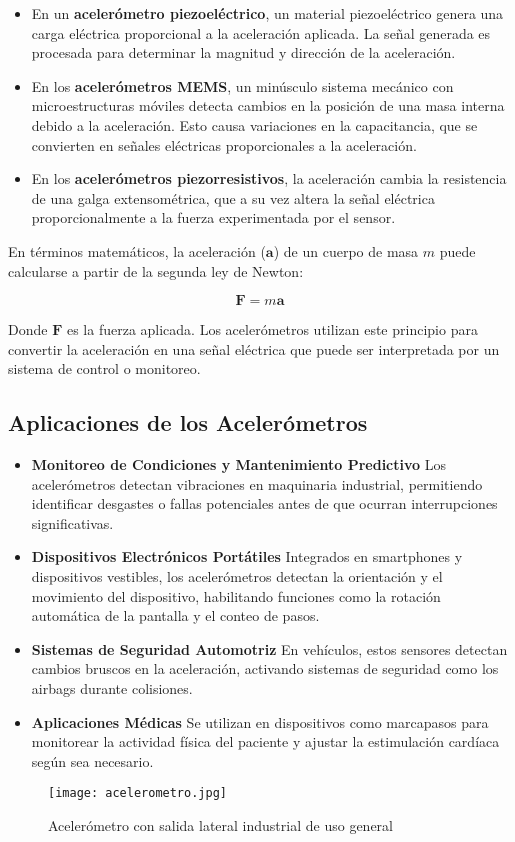 \begin{itemize}
	\item En un \textbf{acelerómetro piezoeléctrico}, un material piezoeléctrico genera una carga eléctrica proporcional a la aceleración aplicada. La señal generada es procesada para determinar la magnitud y dirección de la aceleración.
	
	\item En los \textbf{acelerómetros MEMS}, un minúsculo sistema mecánico con microestructuras móviles detecta cambios en la posición de una masa interna debido a la aceleración. Esto causa variaciones en la capacitancia, que se convierten en señales eléctricas proporcionales a la aceleración.
	
	\item En los \textbf{acelerómetros piezorresistivos}, la aceleración cambia la resistencia de una galga extensométrica, que a su vez altera la señal eléctrica proporcionalmente a la fuerza experimentada por el sensor.
\end{itemize}

En términos matemáticos, la aceleración (\(\mathbf{a}\)) de un cuerpo de masa \(m\) puede calcularse a partir de la segunda ley de Newton:

\[
\mathbf{F} = m \mathbf{a}
\]

Donde \(\mathbf{F}\) es la fuerza aplicada. Los acelerómetros utilizan este principio para convertir la aceleración en una señal eléctrica que puede ser interpretada por un sistema de control o monitoreo.

\subsection{\textbf{Aplicaciones de los Acelerómetros}}
\begin{itemize}
	\item \textbf{Monitoreo de Condiciones y Mantenimiento Predictivo}
	Los acelerómetros detectan vibraciones en maquinaria industrial, permitiendo identificar desgastes o fallas potenciales antes de que ocurran interrupciones significativas.
	
	\item \textbf{Dispositivos Electrónicos Portátiles}
	Integrados en smartphones y dispositivos vestibles, los acelerómetros detectan la orientación y el movimiento del dispositivo, habilitando funciones como la rotación automática de la pantalla y el conteo de pasos.
	
	\item \textbf{Sistemas de Seguridad Automotriz}
	En vehículos, estos sensores detectan cambios bruscos en la aceleración, activando sistemas de seguridad como los airbags durante colisiones.
	
	\item \textbf{Aplicaciones Médicas}
	Se utilizan en dispositivos como marcapasos para monitorear la actividad física del paciente y ajustar la estimulación cardíaca según sea necesario.
\end{itemize}
\begin{figure}[H]
	\centering
	\texttt{[image: acelerometro.jpg]}
	\caption{Acelerómetro con salida lateral industrial de uso general}
\end{figure}

